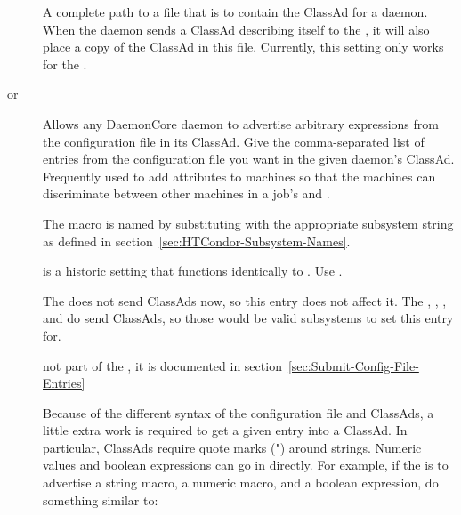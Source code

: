 \begin{description}
\label{param:SubsysDaemonAdFile}
\item[\MacroB{<SUBSYS>\_DAEMON\_AD\_FILE}]
  A complete path to a file that is to contain the ClassAd for a daemon.
  When the daemon sends a ClassAd describing itself to the
  , it will also place a copy of the ClassAd in this
  file. Currently, this setting only works for the .

\label{param:SubsysExprs}
\label{param:SubsysAttrs}
\item[\MacroB{<SUBSYS>\_ATTRS} or
\MacroB{<SUBSYS>\_EXPRS}]
  Allows any DaemonCore daemon to advertise arbitrary
  expressions from the configuration file in its ClassAd.  Give the
  comma-separated list of entries from the configuration file you want in the
  given daemon's ClassAd.
  Frequently used to add attributes to machines so that the
  machines can discriminate between other machines in a job's 
   and .

  The macro is named by substituting 
  with the appropriate subsystem string as defined in
  section~\ref{sec:HTCondor-Subsystem-Names}.

   is a historic setting that functions identically to
  . Use .

  \Note The  does not send
  ClassAds now, so this entry does not affect it.  The
  , , , and
   do send ClassAds, so those would be valid
  subsystems to set this entry for.
  
   not part of the , it is
  documented in section~\ref{sec:Submit-Config-File-Entries}

  Because of the different syntax of the configuration
  file and ClassAds, a little extra work is required to get a
  given entry into a ClassAd.  In particular, ClassAds require quote
  marks (") around strings.  Numeric values and boolean expressions
  can go in directly.  
  For example, if the  is to advertise a string macro, a numeric
  macro, and a boolean expression, do something similar to:


\end{description}
